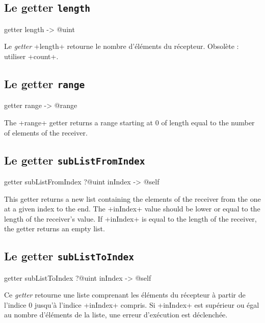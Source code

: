 \subsection{Le getter \texttt{length}}

\begin{galgas}
getter length -> @uint
\end{galgas}

Le \emph{getter} \ggs+length+ retourne le nombre d'éléments du récepteur. Obsolète : utiliser \ggs+count+.


\subsection{Le getter \texttt{range}}

\begin{galgas}
getter range -> @range
\end{galgas}

The \ggs+range+ getter returns a range starting at $0$ of length equal to the number of elements of the receiver.




\subsection{Le getter \texttt{subListFromIndex}}

\begin{galgas}
getter subListFromIndex ?@uint inIndex -> @self
\end{galgas}

This getter returns a new list containing the elements of the receiver from the one at a given index to the end. The  \ggs+inIndex+ value should be lower or equal to the length of the receiver's value. If \ggs+inIndex+ is equal to the length of the receiver, the getter returns an empty list.






\subsection{Le getter \texttt{subListToIndex}}

\begin{galgas}
getter subListToIndex ?@uint inIndex -> @self
\end{galgas}

Ce \emph{getter} retourne une liste comprenant les éléments du récepteur à partir de l'indice $0$ jusqu'à l'indice \ggs+inIndex+ compris. Si \ggs+inIndex+ est supérieur ou égal au nombre d'éléments de la liste, une erreur d'exécution est déclenchée.




